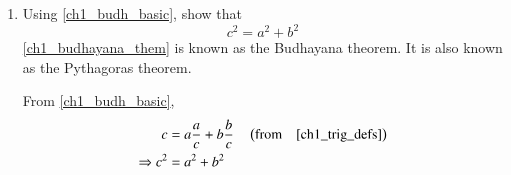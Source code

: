 \begin{enumerate}[label=\arabic*.,ref=\thesubsection.\theenumi]
\item
	Using \eqref{ch1_budh_basic}, show that
	\begin{equation}
	\label{ch1_budhayana_them}
	c^2 = a^2 + b^2
	\end{equation}
	\eqref{ch1_budhayana_them} is known as the Budhayana theorem.  It is also known as the Pythagoras theorem.

\proof From \eqref{ch1_budh_basic},
\begin{align}
c &= a\frac{a}{c} + b \frac{b}{c} \quad \left(\text{from} \quad \eqref{ch1_trig_defs}\right)\\
\Rightarrow c^2 &= a^2 + b^2
\end{align}
\end{enumerate}


